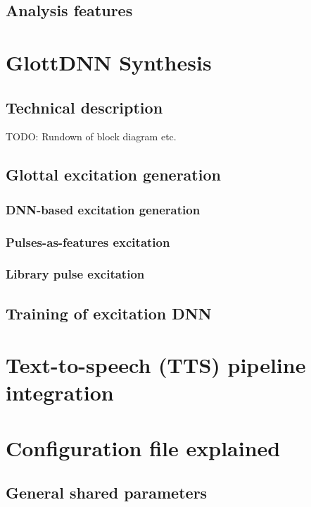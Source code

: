 \documentclass[a4paper, 11pt]{article}
\begin{document}
\subsection{Analysis features}

\section{GlottDNN Synthesis}

\subsection{Technical description}
TODO: Rundown of block diagram etc.

\subsection{Glottal excitation generation}

\subsubsection{DNN-based excitation generation}

\subsubsection{Pulses-as-features excitation}

\subsubsection{Library pulse excitation}

\subsection{Training of excitation DNN}

\section{Text-to-speech (TTS) pipeline integration}

\section{Configuration file explained}

\subsection{General shared parameters}
\end{document}

